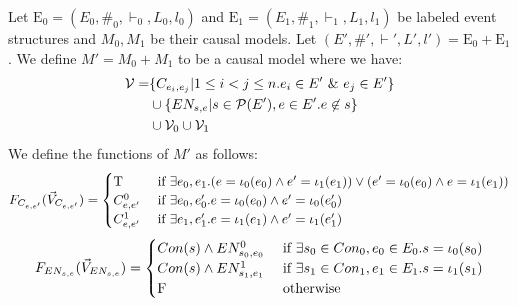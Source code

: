 \begin{definition}
    Let $\mathrm{E}_0 = (E_0,\#_0,\vdash_0,L_0,l_0)$ and
    $\mathrm{E}_1 = (E_1,\#_1,\vdash_1,L_1,l_1)$ be labeled event structures
    and $M_0,M_1$ be their causal models.
    Let $(E',\#',\vdash',L',l') = \mathrm{E_0} + \mathrm{E_1}$.
    We define $M' = M_0 + M_1$ to be a causal model where we have:
    \begin{align*}
        \mathcal{V} = & \{C_{e_i,e_j} |  1 \leq i < j \leq n.
        e_i \in E' \ \& \  e_j \in E'\}                               \\
                      & \cup \{EN_{s,e} | s \in \mathcal{P}(E'),
        e \in E'. e \not \in s \}                                  \\
                      & \cup \mathcal{V}_0 \cup \mathcal{V}_1
    \end{align*}
    We define the functions of $M'$ as follows:
    $$
        F_{C_{e,e'}}(\vec V_{C_{e,e'}}) = \begin{cases}
            \mathrm{T}         & \text{ if } \exists e_0,e_1.
            (e = \iota_0(e_0) \wedge e' = \iota_1(e_1))
            \vee (e' = \iota_0(e_0) \wedge e = \iota_1(e_1))            \\
            C^0_{e,e'} & \text{ if } \exists e_0,e_0'. e = \iota_0(e_0)
            \wedge e' = \iota_0(e_0')                                   \\
            C^1_{e,e'} & \text{ if } \exists e_1,e_1'. e = \iota_1(e_1)
            \wedge e' = \iota_1(e_1')
        \end{cases}
    $$
    $$
        F_{EN_{s,e}}(\vec V_{EN_{s,e}}) = \begin{cases}
            Con(s) \wedge EN^0_{s_0,e_0} & \text{ if }
            \exists s_0 \in Con_0,e_0 \in E_0. s = \iota_0(s_0) \\
            Con(s) \wedge EN^1_{s_1,e_1} & \text{ if }
            \exists s_1 \in Con_1,e_1 \in E_1. s = \iota_1(s_1) \\
            \mathrm{F}                           & \text{ otherwise }
        \end{cases}
    $$
\end{definition}

